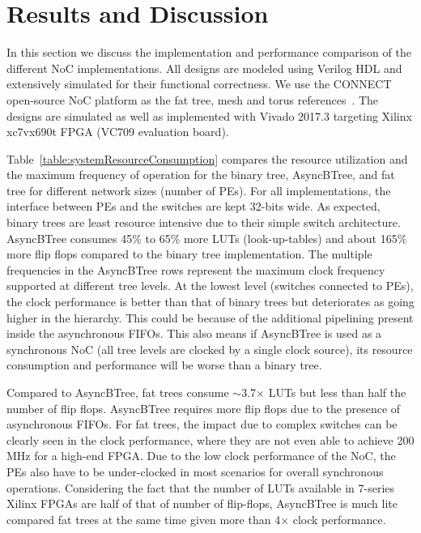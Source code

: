\section{Results and Discussion}
\label{sec:result}

In this section we discuss the implementation and performance comparison of the different NoC implementations.
All designs are modeled using Verilog HDL and extensively simulated for their functional correctness.
We use the CONNECT open-source NoC platform as the fat tree, mesh and torus references~\cite{papa_connect_fpga2012}.
The designs are simulated as well as implemented with Vivado 2017.3 targeting Xilinx xc7vx690t FPGA (VC709 evaluation board).


Table~\ref{table:systemResourceConsumption} compares the resource utilization and the maximum frequency of operation for the binary tree, AsyncBTree, and fat tree for different network sizes (number of PEs).
For all implementations, the interface between PEs and the switches are kept 32-bits wide.
As expected, binary trees are least resource intensive due to their simple switch architecture.
AsyncBTree consumes 45\% to 65\% more LUTs (look-up-tables) and about 165\% more flip flops compared to the binary tree implementation.
The multiple frequencies in the AsyncBTree rows represent the maximum clock frequency supported at different tree levels.
At the lowest level (switches connected to PEs), the clock performance is better than that of binary trees but deteriorates as going higher in the hierarchy.
This could be because of the additional pipelining present inside the asynchronous FIFOs.
This also means if AsyncBTree is used as a synchronous NoC (all tree levels are clocked by a single clock source), its resource consumption and performance will be worse than a binary tree. 

Compared to AsyncBTree, fat trees consume $\sim$3.7$\times$ LUTs but less than half the number of flip flops.
AsyncBTree requires more flip flops due to the presence of asynchronous FIFOs.
For fat trees, the impact due to complex switches can be clearly seen in the clock performance, where they are not even able to achieve 200 MHz for a high-end FPGA.
Due to the low clock performance of the NoC, the PEs also have to be under-clocked in most scenarios for overall synchronous operations.
Considering the fact that the number of LUTs available in 7-series Xilinx FPGAs are half of that of number of flip-flops, AsyncBTree is much lite compared fat trees at the same time given more than 4$\times$ clock performance.

